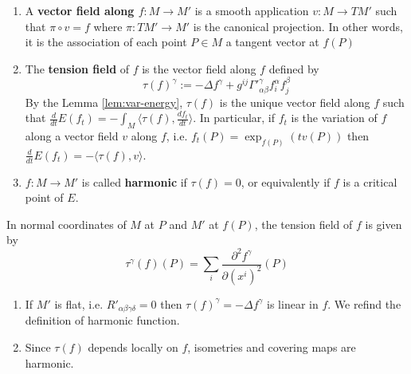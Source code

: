 \begin{definition}
\begin{enumerate}
\item A \textbf{vector field along \(f: M \longrightarrow M'\)} is a smooth application \(v: M\longrightarrow TM'\) such that \(\pi\circ v = f\) where \(\pi: TM' \longrightarrow M'\) is the canonical projection. In other words, it is the association of each point \(P\in M\) a tangent vector at \(f(P)\)
\item The \textbf{tension field} of \(f\) is the vector field along \(f\) defined by
\[
   \tau(f)^\gamma:= -\Delta f^\gamma +g^{ij}\Gamma'^{\gamma}_{\alpha\beta} f^{\alpha}_{i}f^{\beta}_{j}
   \]
By the Lemma \ref{lem:var-energy}, \(\tau(f)\) is the unique vector field along \(f\)
such that \(\frac{d }{dt}E(f_t) = -\int_M \langle \tau(f), \frac{df_t}{dt}\rangle\). In
particular, if \(f_t\) is the variation of \(f\) along a vector field \(v\) along
\(f\), i.e. \(f_t(P) = \exp_{f(P)}(tv(P))\) then \(\frac{d}{dt} E(f_t) = - \langle \tau(f), v
   \rangle\).
\item \(f: M \longrightarrow M'\) is called \textbf{harmonic} if \(\tau(f)=0\), or equivalently if
\(f\) is a critical point of \(E\).
\end{enumerate}
\end{definition}

In normal coordinates of \(M\) at \(P\) and \(M'\) at \(f(P)\), the tension field
of \(f\) is given by
\[
\tau^\gamma(f)(P) = \sum_i \frac{\partial^2 f^\gamma}{\partial (x^i)^2}(P)
\]

\begin{remark}
\begin{enumerate}
\item If \(M'\) is flat, i.e. \(R'_{\alpha\beta\gamma\delta} = 0\) then \(\tau(f)^\gamma
   = -\Delta f^\gamma\) is linear in \(f\). We refind the definition of harmonic function.
\item Since \(\tau(f)\) depends locally on \(f\), isometries and covering maps are
harmonic.
\end{enumerate}
\end{remark}

